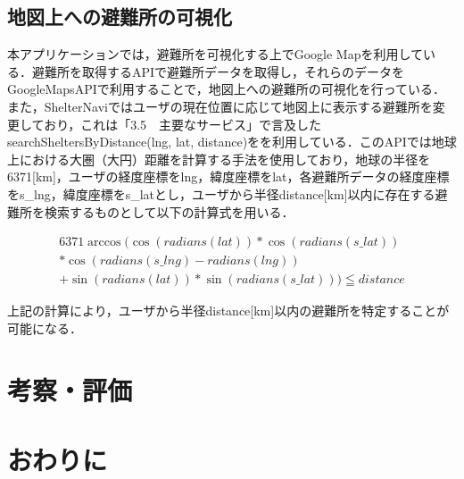 \documentclass[technicalreport]{ieicej}
\begin{document}

\subsection{地図上への避難所の可視化}
本アプリケーションでは，避難所を可視化する上でGoogle Mapを利用している．避難所を取得するAPIで避難所データを取得し，それらのデータをGoogleMapsAPIで利用することで，地図上への避難所の可視化を行っている．また，ShelterNaviではユーザの現在位置に応じて地図上に表示する避難所を変更しており，これは「3.5　主要なサービス」で言及したsearchSheltersByDistance(lng, lat, distance)をを利用している．このAPIでは地球上における大圏（大円）距離を計算する手法を使用しており，地球の半径を6371[km]，ユーザの経度座標をlng，緯度座標をlat，各避難所データの経度座標をs\_lng，緯度座標をs\_latとし，ユーザから半径distance[km]以内に存在する避難所を検索するものとして以下の計算式を用いる．

\begin{eqnarray*}
    6371 \arccos ( \cos( radians( lat ) ) * \cos( radians( s\_lat ) ) \\* \cos( radians( s\_lng ) - radians( lng ) ) \\+ \sin( radians( lat ) ) * \sin( radians( s\_lat ) ) ) \leqq distance
\end{eqnarray*}

上記の計算により，ユーザから半径distance[km]以内の避難所を特定することが可能になる．



\subsection{}

\section{考察・評価}

\section{おわりに}


%
%
\begin{thebibliography}{99}%
\bibitem{}
\end{thebibliography}
\end{document}
